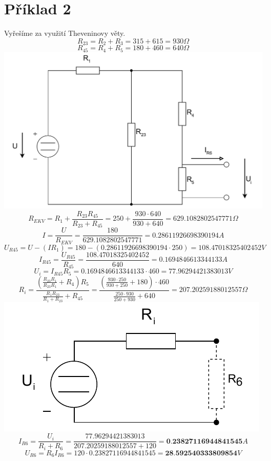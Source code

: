 \section{Příklad 2}
Vyřešíme za využití Theveninovy věty.\\
\[
  R_{23} = R_{2} + R_{3} = 315 + 615 = 930 \Omega
\]
\[
  R_{45} = R_4 + R_5 = 180 + 460 = 640 \Omega
\]
\includegraphics[scale=0.5,keepaspectratio]{fig/Pr2_1.pdf}
\[
  R_{EKV} = R_1 + \displaystyle\frac{R_{23}R_{45}}{R_{23}+R_{45}}
  = 250 + \displaystyle\frac{930 \cdot 640}{930 + 640}
  = 629.1082802547771 \Omega
\]
\[
  I = \displaystyle\frac{U}{R_{EKV}}
  = \displaystyle\frac{180}{629.1082802547771}
  = 0.28611926698390194A
\]
\[
  U_{R45} = U - (I R_1)
  = 180 - (0.28611926698390194\cdot 250)
  = 108.47018325402452 V
\]
\[
  I_{R45} = \displaystyle\frac{U_{R45}}{R_{45}}
  = \displaystyle\frac{108.47018325402452}{640}
  = 0.1694846613344133 A
\]
\[
  U_i = I_{R45} R_5
  = 0.1694846613344133 \cdot 460
  = 77.96294421383013 V
\]
\[
  R_i = \displaystyle\frac{(\displaystyle\frac{R_{23}R_{1}}{R_{23}R_1}+R_4)R_5}{
    \displaystyle\frac{R_1 R_{23}}{R_1 + R_{23}}+R_{45}
  }
  = \displaystyle\frac{(\displaystyle\frac{930\cdot 250}{930+250}+180)\cdot 460}{
    \displaystyle\frac{250 \cdot 930}{250 + 930}+640
  }
  = 207.20259188012557 \Omega
\]
\includegraphics[scale=1.0,keepaspectratio]{fig/Pr2_2.pdf}
\[
  I_{R6} = \displaystyle\frac{U_i}{R_i + R_6}
  = \displaystyle\frac{77.96294421383013}{207.20259188012557 + 120}
  = \textbf{0.23827116944841545}A
\]
\[
  U_{R6} = R_6 I_{R6}
  = 120 \cdot 0.23827116944841545 
  = \textbf{28.592540333809854}V
\]

